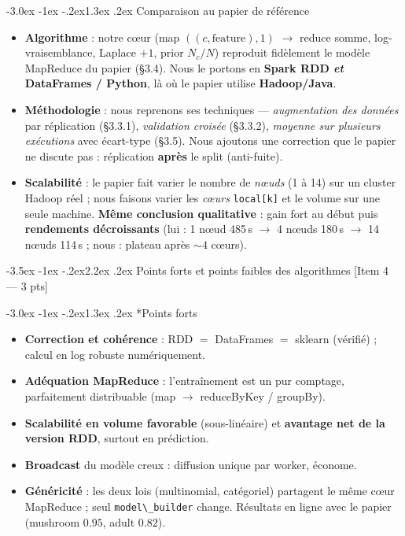 \documentclass[11pt,a4paper]{article}
\makeatletter
\newcommand{\code}[1]{\lstinline[style=py]!#1!}
\renewcommand\section{\@startsection{section}{1}{\z@}%
  {-3.5ex \@plus -1ex \@minus -.2ex}{2.2ex \@plus.2ex}%
  {\normalfont\Large\bfseries\color{primary}}}
\renewcommand\subsection{\@startsection{subsection}{2}{\z@}%
  {-3.0ex \@plus -1ex \@minus -.2ex}{1.3ex \@plus.2ex}%
  {\normalfont\large\bfseries\color{primary!88!black}}}
\makeatother
\begin{document}
\subsection{Comparaison au papier de référence}
\label{sec:comparaison}
\begin{itemize}
  \item \textbf{Algorithme} : notre cœur (map $((c,\text{feature}),1)$ $\to$ reduce somme,
        log-vraisemblance, Laplace $+1$, prior $N_c/N$) reproduit fidèlement le modèle
        MapReduce du papier (§3.4). Nous le portons en \textbf{Spark RDD \emph{et} DataFrames /
        Python}, là où le papier utilise \textbf{Hadoop/Java}.
  \item \textbf{Méthodologie} : nous reprenons ses techniques --- \emph{augmentation des
        données} par réplication (§3.3.1), \emph{validation croisée} (§3.3.2), \emph{moyenne
        sur plusieurs exécutions} avec écart-type (§3.5). Nous ajoutons une correction que le
        papier ne discute pas : réplication \textbf{après} le split (anti-fuite).
  \item \textbf{Scalabilité} : le papier fait varier le nombre de \emph{nœuds} (1 à 14) sur un
        cluster Hadoop réel ; nous faisons varier les \emph{cœurs} \code{local[k]} et le volume
        sur une seule machine. \textbf{Même conclusion qualitative} : gain fort au début puis
        \textbf{rendements décroissants} (lui : 1 nœud 485\,s $\to$ 4 nœuds 180\,s $\to$ 14
        nœuds 114\,s ; nous : plateau après ${\sim}4$ cœurs).
\end{itemize}

\section{Points forts et points faibles des algorithmes \hfill\normalsize\textmd{[Item 4 --- 3 pts]}}
\label{sec:forces}

\subsection*{Points forts}
\begin{itemize}
  \item \textbf{Correction et cohérence} : RDD $=$ DataFrames $=$ sklearn (vérifié) ; calcul en
        log robuste numériquement.
  \item \textbf{Adéquation MapReduce} : l'entraînement est un pur comptage, parfaitement
        distribuable (map $\to$ reduceByKey / groupBy).
  \item \textbf{Scalabilité en volume favorable} (sous-linéaire) et \textbf{avantage net de la
        version RDD}, surtout en prédiction.
  \item \textbf{Broadcast} du modèle creux : diffusion unique par worker, économe.
  \item \textbf{Généricité} : les deux lois (multinomial, catégoriel) partagent le même cœur
        MapReduce ; seul \code{model\_builder} change. Résultats en ligne avec le papier
        (mushroom $0.95$, adult $0.82$).
\end{itemize}
\end{document}
